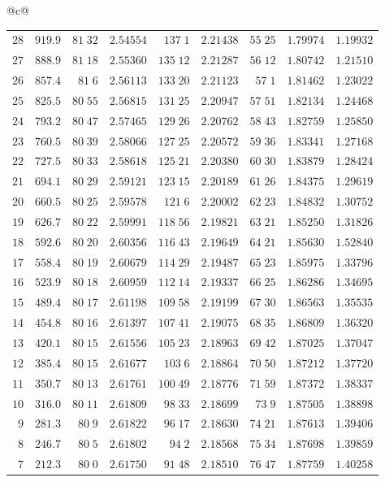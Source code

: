 \begin{center}
{\begin{tabular}{@{}c@{}}
\begin{tabular}{r|r|r|r|r|r|r|r|r}
$28$&$919.9$&$81\;32$&$2.54554$&$137\;1$&$2.21438$&$55\;25$&$1.79974$&$1.19932$\\
$27$&$888.9$&$81\;18$&$2.55360$&$135\;12$&$2.21287$&$56\;12$&$1.80742$&$1.21510$\\
$26$&$857.4$&$81\;6$&$2.56113$&$133\;20$&$2.21123$&$57\;1$&$1.81462$&$1.23022$\\[2pt]
$25$&$825.5$&$80\;55$&$2.56815$&$131\;25$&$2.20947$&$57\;51$&$1.82134$&$1.24468$\\
$24$&$793.2$&$80\;47$&$2.57465$&$129\;26$&$2.20762$&$58\;43$&$1.82759$&$1.25850$\\
$23$&$760.5$&$80\;39$&$2.58066$&$127\;25$&$2.20572$&$59\;36$&$1.83341$&$1.27168$\\
$22$&$727.5$&$80\;33$&$2.58618$&$125\;21$&$2.20380$&$60\;30$&$1.83879$&$1.28424$\\
$21$&$694.1$&$80\;29$&$2.59121$&$123\;15$&$2.20189$&$61\;26$&$1.84375$&$1.29619$\\[2pt]
$20$&$660.5$&$80\;25$&$2.59578$&$121\;6$&$2.20002$&$62\;23$&$1.84832$&$1.30752$\\
$19$&$626.7$&$80\;22$&$2.59991$&$118\;56$&$2.19821$&$63\;21$&$1.85250$&$1.31826$\\
$18$&$592.6$&$80\;20$&$2.60356$&$116\;43$&$2.19649$&$64\;21$&$1.85630$&$1.52840$\\
$17$&$558.4$&$80\;19$&$2.60679$&$114\;29$&$2.19487$&$65\;23$&$1.85975$&$1.33796$\\
$16$&$523.9$&$80\;18$&$2.60959$&$112\;14$&$2.19337$&$66\;25$&$1.86286$&$1.34695$\\[2pt]
$15$&$489.4$&$80\;17$&$2.61198$&$109\;58$&$2.19199$&$67\;30$&$1.86563$&$1.35535$\\
$14$&$454.8$&$80\;16$&$2.61397$&$107\;41$&$2.19075$&$68\;35$&$1.86809$&$1.36320$\\
$13$&$420.1$&$80\;15$&$2.61556$&$105\;23$&$2.18963$&$69\;42$&$1.87025$&$1.37047$\\
$12$&$385.4$&$80\;15$&$2.61677$&$103\;6$&$2.18864$&$70\;50$&$1.87212$&$1.37720$\\
$11$&$350.7$&$80\;13$&$2.61761$&$100\;49$&$2.18776$&$71\;59$&$1.87372$&$1.38337$\\[2pt]
$10$&$316.0$&$80\;11$&$2.61809$&$98\;33$&$2.18699$&$73\;9$&$1.87505$&$1.38898$\\
$9$&$281.3$&$80\;9$&$2.61822$&$96\;17$&$2.18630$&$74\;21$&$1.87613$&$1.39406$\\
$8$&$246.7$&$80\;5$&$2.61802$&$94\;2$&$2.18568$&$75\;34$&$1.87698$&$1.39859$\\
$7$&$212.3$&$80\;0$&$2.61750$&$91\;48$&$2.18510$&$76\;47$&$1.87759$&$1.40258$\\

\end{tabular}
\end{tabular}}
\end{center}
